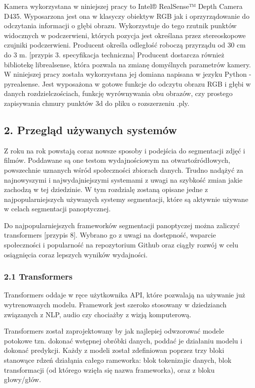 \documentclass[
]{article}
\begin{document}
Kamera wykorzystana w niniejszej pracy to Intel® RealSense™ Depth Camera D435. Wyposarzona jest ona w klasyczy obiektyw RGB jak i oprzyrządowanie do odczytania informacji o głębi obrazu. Wykorzystuje do tego rzutnik punktów widocznych w podczerwieni, których pozycja jest określana przez stereoskopowe czujniki podczerwieni. Producent określa odległość roboczą przyrządu od 30 cm do 3 m. {[}przypis 3. specyfikacja techniczna{]}
Producent dostarcza również bibliotekę librealsense, która pozwala na zmianę domyślnych parametrów kamery. W niniejszej pracy została wykorzystana jej domiana napisana w jezyku Python - pyrealsense. Jest wyposażona w gotowe funkcje do odczytu obrazu RGB i głębi w danych rozdzielczościach, funkcję wyrównywania obu obrazów, czy prostego zapisywania chmury punktów 3d do pliku o rozszerzeniu .ply.

\subsection{2. Przegląd używanych systemów}\label{przeglux105d-uux17cywanych-systemuxf3w}

Z roku na rok powstają coraz nowsze sposoby i podejścia do segmentacji zdjęć i filmów. Poddawane są one testom wydajnościowym na otwartoźródłowych, powszechnie uznanych wśród społeczności zbiorach danych. Trudno nadążyć za najnowyszymi i najwydajniejszymi systemami z uwagi na szybkość zmian jakie zachodzą w tej dziedzinie.
W tym rozdzialę zostaną opisane jedne z najpopularniejszych używanych systemy segmentacji, które są aktywnie używane w celach segmentacji panoptycznej.

Do najpopularniejszych frameworków segmentacji panoptyczej można zaliczyć transformers {[}przypis 8{]}. Wybrano go z uwagi na dostępność, wsparcie społeczności i popularność na repozytorium Github oraz ciągły rozwój w celu osiągnięcia coraz lepszych wyników wydajności.

\subsubsection{2.1 Transformers}\label{transformers}

Transformers oddaje w ręce użytkownika API, które pozwalają na używanie już wytrenowanych modelu. Framework jest szeroko stosowany w dziedzianch związanych z NLP, audio czy chociażby z wizją komputerową.

Transformers został zaprojektowany by jak najlepiej odwzorować modele potokowe tzn. dokonać wstępnej obróbki danych, poddać je działaniu modelu i dokonać predykcji. Każdy z modeli został zdefiniowan poprzez trzy bloki stanowące rdzeń działąnia całego rameworka: blok tokenizajic danych, blok transformacji (od którego wzięła się nazwa frameworka), oraz z bloku głowy/głów.
\end{document}
